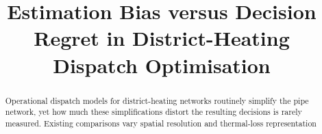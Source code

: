 \documentclass[a4paper,fleqn]{cas-sc}
\begin{document}
\title[mode=title]{%
  Estimation Bias versus Decision Regret in District-Heating Dispatch Optimisation}

\begin{abstract}
Operational dispatch models for district-heating networks routinely simplify the pipe
network, yet how much these simplifications distort the resulting decisions is rarely
measured. Existing comparisons vary spatial resolution and thermal-loss representation

\end{abstract}
\end{document}
